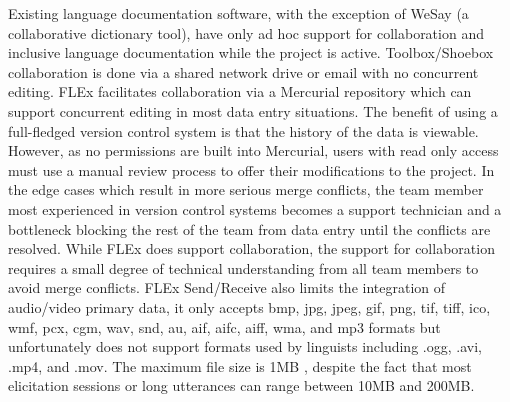 \documentclass[11pt]{article}
\newcommand{\smalltodo}[2][]
    {\todo[caption={#2}, #1]
    {\tiny#2\normalsize}}
\begin{document}
Existing language documentation software,  with the exception of WeSay (a
collaborative dictionary tool), have only ad hoc support for collaboration and
inclusive language documentation while the project is active. Toolbox/Shoebox
collaboration is done via a shared network drive or email with no concurrent
editing. FLEx  facilitates collaboration via a Mercurial repository
\cite{FLExSendReceive:2013:Online} which can  support concurrent 
editing in most data entry situations. The benefit of using a full-fledged
version control system is that the history of the data is viewable. 
However, as no permissions are built into Mercurial, users with read only
access must use a manual review process to offer their modifications to the
project. In the edge cases which result in more serious merge conflicts, the
team member most experienced in version control systems becomes a
support technician and a bottleneck blocking the rest of the team from data
entry until the conflicts are resolved.  While FLEx does support collaboration,
the support for collaboration requires a small degree of technical
understanding from all team members to avoid merge conflicts.  FLEx
Send/Receive also limits the integration of audio/video primary data, it only
accepts bmp, jpg, jpeg, gif, png, tif, tiff, ico, wmf, pcx,  cgm, wav, snd, au,
aif, aifc, aiff, wma, and mp3 formats  \cite{FLExSendReceive:2013:Online} but unfortunately does not support formats used by linguists including .ogg, .avi, .mp4, and .mov. The maximum file size is 1MB  \cite{FLExSendReceive:2013:Online}, despite the fact that most elicitation sessions or long utterances can range between 10MB and 200MB. 

% 
\end{document}
